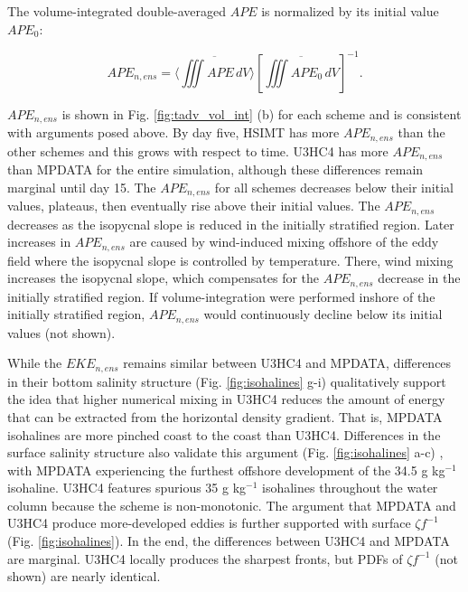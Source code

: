 \documentclass[draft]{agujournal2019}
\begin{document}
The volume-integrated double-averaged $APE$ is normalized by its initial value $APE_0$:
\begin{linenomath*}
    \begin{equation}
        APE_{n, ens} = \langle \overline{\iiint APE \, dV} \rangle \left[\overline{\iiint APE_0 \,dV}\right]^{-1}.
    \end{equation}
\end{linenomath*}

$APE_{n, ens}$ is shown in Fig. \ref{fig:tadv_vol_int} (b) for each scheme and is consistent with arguments posed above. By day five, HSIMT has more $APE_{n, ens}$ than the other schemes and this grows with respect to time. U3HC4 has more $APE_{n, ens}$ than MPDATA for the entire simulation, although these differences remain marginal until day 15. The $APE_{n, ens}$ for all schemes decreases below their initial values, plateaus, then eventually rise above their initial values. The $APE_{n, ens}$ decreases as the isopycnal slope is reduced in the initially stratified region. Later increases in $APE_{n, ens}$ are caused by wind-induced mixing offshore of the eddy field where the isopycnal slope is controlled by temperature. There, wind mixing increases the isopycnal slope, which compensates for the $APE_{n, ens}$ decrease in the initially stratified region. If volume-integration were performed inshore of the initially stratified region, $APE_{n, ens}$ would continuously decline below its initial values (not shown). 

While the $EKE_{n, ens}$ remains similar between U3HC4 and MPDATA, differences in their bottom salinity structure (Fig. \ref{fig:isohalines} g-i) qualitatively support the idea that higher numerical mixing in U3HC4 reduces the amount of energy that can be extracted from the horizontal density gradient. That is, MPDATA isohalines are more pinched coast to the coast than U3HC4. Differences in the surface salinity structure also validate this argument (Fig. \ref{fig:isohalines} a-c) , with MPDATA experiencing the furthest offshore development of the 34.5 g kg$^{-1}$ isohaline. U3HC4 features spurious 35 g kg$^{-1}$ isohalines throughout the water column because the scheme is non-monotonic.  The argument that MPDATA and U3HC4 produce more-developed eddies is further supported with surface $\zeta f^{-1}$ (Fig. \ref{fig:isohalines}). In the end, the differences between U3HC4 and MPDATA are marginal. U3HC4 locally produces the sharpest fronts, but PDFs of $\zeta f^{-1}$ (not shown) are nearly identical.
\end{document}
